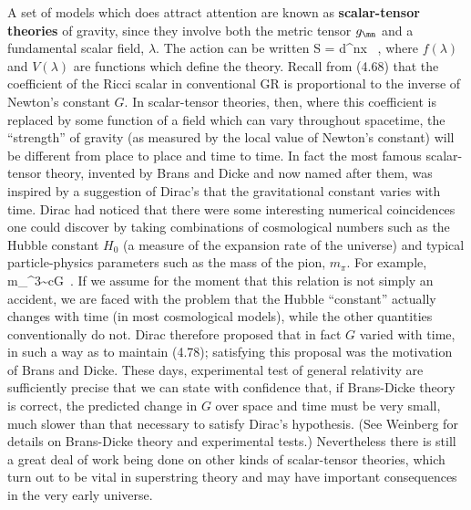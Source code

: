 A set of models which does attract attention are known as 
{\bf scalar-tensor theories} of gravity, since they involve both
the metric tensor $g_\mn$ and a fundamental scalar field, $\lambda$.
The action can be written
\be
  S = \int d^nx \g {}\ ,\label{4.77}
\ee
where $f(\lambda)$ and $V(\lambda)$ are functions which define the
theory.  Recall from (4.68) that the coefficient of the Ricci scalar
in conventional GR is proportional to the inverse of Newton's constant
$G$.  In scalar-tensor theories, then, where this coefficient is replaced
by some function of a field which can vary throughout spacetime,
the ``strength'' of gravity (as measured by the local value of Newton's
constant) will be different from place to place and time to time.
In fact the most famous scalar-tensor theory, invented by Brans and
Dicke and now named after them, was inspired by a suggestion of 
Dirac's that the gravitational constant varies with time.  Dirac had
noticed that there were some interesting numerical coincidences one
could discover by taking combinations of cosmological numbers such as the
Hubble constant $H_0$ (a measure of the expansion rate of the universe)
and typical particle-physics parameters such as the mass of the pion,
$m_\pi$.  For example,
\be
  {{m_\pi^3}}\sim {{cG}}\ .\label{4.78}
\ee
If we assume for the moment that this relation is not simply an
accident, we are faced with the problem that the Hubble ``constant''
actually changes with time (in most cosmological models), while the
other quantities conventionally do not.  Dirac therefore proposed that
in fact $G$ varied with time, in such a way as to maintain (4.78);
satisfying this proposal was the motivation of Brans and Dicke.
These days, experimental test of general relativity are sufficiently
precise that we can state with confidence that, if Brans-Dicke theory
is correct, the predicted change in $G$ over space and time must be
very small, much slower than that necessary to satisfy Dirac's
hypothesis.  (See Weinberg for details on Brans-Dicke theory and
experimental tests.)
Nevertheless there is still a great deal of work being
done on other kinds of scalar-tensor theories, which turn out to be
vital in superstring theory and may have important consequences in 
the very early universe.

